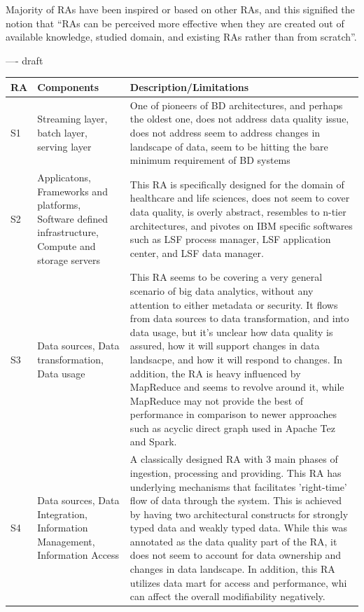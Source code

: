 \documentclass[review]{elsarticle}
\begin{document}
Majority of RAs have been inspired or based on other RAs, and this signified the notion that “RAs can be perceived more effective when they are created out of available knowledge, studied domain, and existing RAs rather than from scratch”.


---- draft


\begin{table}[h!]
    \begin{tabular}{ |p{0.5cm}|p{3cm}|p{7.5cm}| }
        \hline
        RA & Components & Description/Limitations \\ 
        \hline
        S1 & Streaming layer, batch layer, serving layer & One of pioneers of BD architectures, and perhaps the oldest one, does not address data quality issue, does not address seem to address changes in landscape of data, seem to be hitting the bare minimum requirement of BD systems  \\
        \hline
        S2 & Applicatons, Frameworks and platforms, Software defined infrastructure, Compute and storage servers & This RA is specifically designed for the domain of healthcare and life sciences, does not seem to cover data quality, is overly abstract, resembles to n-tier architectures, and pivotes on IBM specific softwares such as LSF process manager, LSF application center, and LSF data manager. \\
        \hline
        S3 & Data sources, Data transformation, Data usage & This RA seems to be covering a very general scenario of big data analytics, without any attention to either metadata or security. It flows from data sources to data transformation, and into data usage, but it's unclear how data quality is assured, how it will support changes in data landsacpe, and how it will respond to changes. In addition, the RA is heavy influenced by MapReduce and seems to revolve around it, while MapReduce may not provide the best of performance in comparison to newer approaches such as acyclic direct graph used in Apache Tez and Spark.  \\
        \hline
        S4 & Data sources, Data Integration, Information Management, Information Access & A classically designed RA with 3 main phases of ingestion, processing and providing. This RA has underlying mechanisms that facilitates 'right-time' flow of data through the system. This is achieved by having two architectural constructs for strongly typed data and weakly typed data. While this was annotated as the data quality part of the RA, it does not seem to account for data ownership and changes in data landscape. In addition, this RA utilizes data mart for access and performance, whi can affect the overall modifiability negatively.   \\

\end{tabular}
\end{table}
\end{document}
